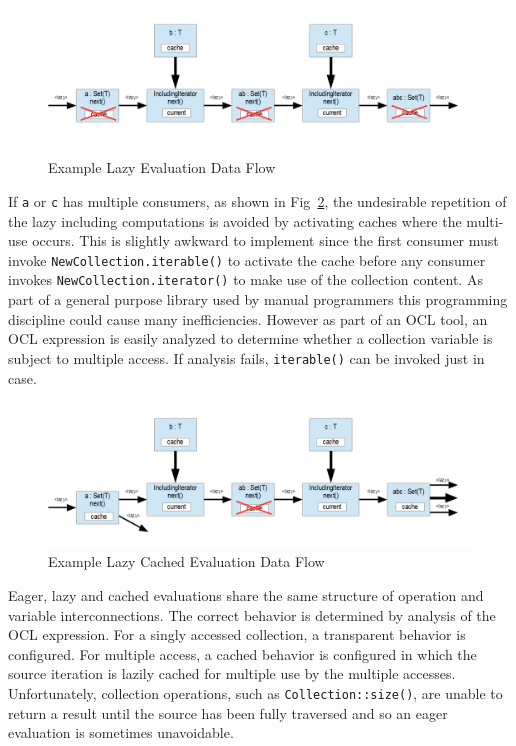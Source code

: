 \documentclass{llncs}
\begin{document}
\begin{figure}
	\begin{center}
		\includegraphics[width=4.5in]{LazyExample.png}
	\end{center}
	\caption{Example Lazy Evaluation Data Flow}
	\label{fig:LazyExample}
\end{figure}

If \verb$a$ or \verb$c$ has multiple consumers, as shown in Fig~\ref{fig:LazyCachedExample}, the undesirable repetition of the lazy including computations is avoided by activating caches where the multi-use occurs. This is slightly awkward to implement since the first consumer must invoke \verb$NewCollection.iterable()$ to activate the cache before any consumer invokes \verb$NewCollection.iterator()$ to make use of the collection content. As part of a general purpose library used by manual programmers this programming discipline could cause many inefficiencies. However as part of an OCL tool, an OCL expression is easily analyzed to determine whether a collection variable is subject to multiple access. If analysis fails, \verb$iterable()$ can be invoked just in case.

\begin{figure}
	\begin{center}
		\includegraphics[width=4.5in]{LazyCachedExample.png}
	\end{center}
	\caption{Example Lazy Cached Evaluation Data Flow}
	\label{fig:LazyCachedExample}
\end{figure}

Eager, lazy and cached evaluations share the same structure of operation and variable interconnections. The correct behavior is determined by analysis of the OCL expression. For a singly accessed collection, a transparent behavior is configured. For multiple access, a cached behavior is configured in which the source iteration is lazily cached for multiple use by the multiple accesses. Unfortunately, collection operations, such as \verb$Collection::size()$, are unable to return a result until the source has been fully traversed and so an eager evaluation is sometimes unavoidable.
\end{document}
